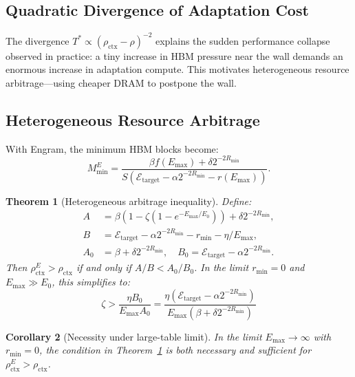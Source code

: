 \documentclass[11pt,a4paper]{article}
\theoremstyle{plain}
\newtheorem{theorem}{Theorem}[section]
\newtheorem{corollary}[theorem]{Corollary}
\theoremstyle{definition}
\begin{document}
\subsection{Quadratic Divergence of Adaptation Cost}
\label{sec:quadratic}
The divergence $T^* \propto (\rho_{\text{ctx}}-\rho)^{-2}$ explains the sudden performance collapse observed in practice: a tiny increase in HBM pressure near the wall demands an enormous increase in adaptation compute. This motivates heterogeneous resource arbitrage---using cheaper DRAM to postpone the wall.

\subsection{Heterogeneous Resource Arbitrage}
\label{sec:arbitrage}
With Engram, the minimum HBM blocks become:
\begin{equation}
M_{\min}^E = \frac{\beta f(E_{\max}) + \delta 2^{-2R_{\min}}}{S(\mathcal{E}_{\text{target}} - \alpha 2^{-2R_{\min}} - r(E_{\max}))}. \label{eq:MminE}
\end{equation}

\begin{theorem}[Heterogeneous arbitrage inequality]\label{thm:arbitrage}
Define:
\begin{align*}
A &= \beta(1-\zeta(1-e^{-E_{\max}/E_0})) + \delta 2^{-2R_{\min}}, \\
B &= \mathcal{E}_{\text{target}} - \alpha 2^{-2R_{\min}} - r_{\min} - \eta/E_{\max}, \\
A_0 &= \beta + \delta 2^{-2R_{\min}}, \quad B_0 = \mathcal{E}_{\text{target}} - \alpha 2^{-2R_{\min}}.
\end{align*}
Then $\rho_{\text{ctx}}^E > \rho_{\text{ctx}}$ if and only if $A/B < A_0/B_0$. In the limit $r_{\min} = 0$ and $E_{\max} \gg E_0$, this simplifies to:
\begin{equation}
\boxed{\zeta > \frac{\eta B_0}{E_{\max} A_0} = \frac{\eta(\mathcal{E}_{\text{target}} - \alpha 2^{-2R_{\min}})}{E_{\max}(\beta + \delta 2^{-2R_{\min}})}}
\end{equation}
\end{theorem}

\begin{corollary}[Necessity under large-table limit]\label{cor:necessity}
In the limit $E_{\max} \to \infty$ with $r_{\min} = 0$, the condition in Theorem~\ref{thm:arbitrage} is both necessary and sufficient for $\rho_{\text{ctx}}^E > \rho_{\text{ctx}}$.
\end{corollary}
\end{document}
